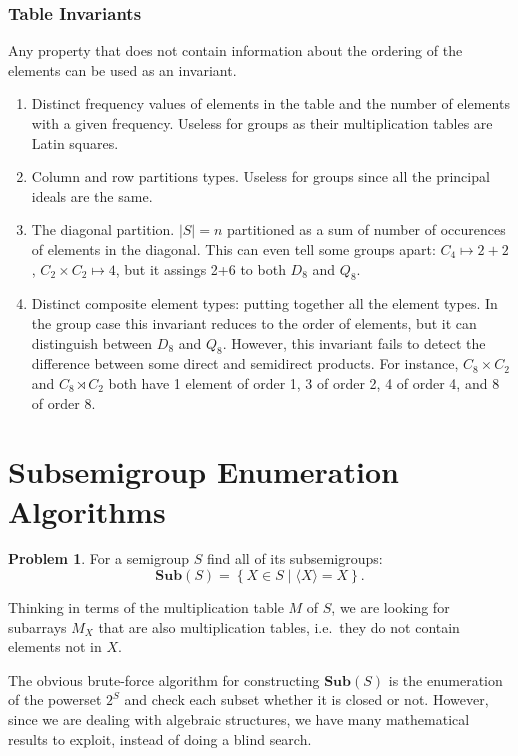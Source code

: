 \documentclass{amsart}
\newcommand{\Sub}{\mathbf{Sub}}
\theoremstyle{plain}
\theoremstyle{definition}
\newtheorem{problem}[theorem]{Problem}
\begin{document}
\subsubsection{Table Invariants}

Any property that does not contain information about the ordering of the elements can be used as an invariant.
\begin{enumerate}
\item Distinct frequency values of elements in the table and the number of elements with a given frequency. Useless for groups as their multiplication tables are Latin squares.
\item Column and row partitions types.   Useless for groups since all the principal ideals are the same.
\item The diagonal partition. $|S|=n$ partitioned as a sum of number of occurences of elements in the diagonal. This can even tell some groups apart: $C_4\mapsto 2+2$, $C_2\times C_2\mapsto 4$, but it assings 2+6 to both $D_8$ and $Q_8$.
\item Distinct composite element types: putting together all the element types. In the group case this invariant reduces to the order of elements, but it can distinguish between $D_8$ and $Q_8$. However, this invariant fails to detect the difference between some direct and semidirect products. For instance, $C_8\times C_2$ and $C_8\rtimes C_2$ both have 1 element of order 1, 3 of order 2, 4 of order 4, and 8 of order 8.
\end{enumerate} 



\section{Subsemigroup Enumeration Algorithms}
\label{sec:enum}


\begin{problem}
For a semigroup $S$ find all of its subsemigroups:
$$\Sub(S)=\left\{ X\in S\mid \langle X\rangle=X\right\}.$$
\end{problem}
Thinking in terms of the multiplication table $M$ of $S$, we are looking for subarrays $M_X$ that are also multiplication tables, i.e.\ they do not contain elements not in $X$.

The obvious brute-force algorithm for constructing $\Sub(S)$ is the enumeration of the powerset $2^S$ and check each subset whether it is closed or not.
However, since we are dealing with algebraic structures, we have many mathematical results to exploit, instead of doing a blind search.
\end{document}
